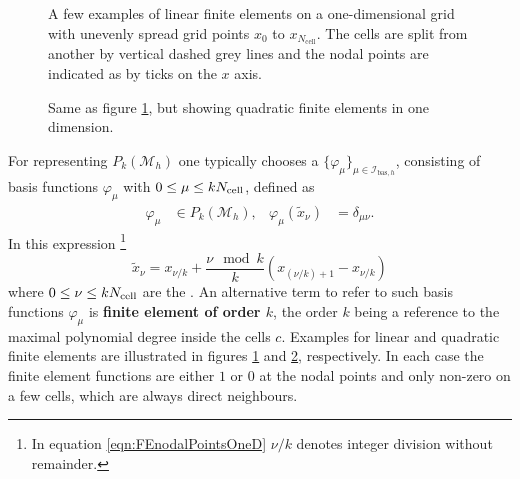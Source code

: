 \begin{figure}
	\centering
	\caption[Examples of linear finite elements in one dimension]
	{
		A few examples of linear finite elements
		on a one-dimensional grid
		with unevenly spread grid points
		$x_0$ to $x_{N_\text{cell}}$.
		The cells are split from another
		by vertical dashed grey lines
		and the nodal points are indicated as by ticks
		on the $x$ axis.
	}
	\label{fig:FEoneDimLin}
\end{figure}
\begin{figure}
	\centering
	\caption[Examples of quadratic finite elements in one dimension]
	{
		Same as figure \ref{fig:FEoneDimLin},
		but showing quadratic finite elements in one dimension.
	}
	\label{fig:FEoneDimQuad}
\end{figure}
\newcommand{\Ibash}{\mathcal{I}_{\text{bas},h}}
For representing $P_k(\mathcal{M}_h)$
one typically chooses a  $\{\varphi_\mu\}_{\mu\in \Ibash}$,
consisting of basis functions $\varphi_\mu$ with $0 \leq \mu \leq k N_\text{cell}$,
defined as
\begin{align*}
	\varphi_\mu &\in P_k(\mathcal{M}_h), &
	\varphi_\mu(\tilde{x}_\nu) &= \delta_{\mu\nu}.
\end{align*}
In this expression%
\footnote{In equation \eqref{eqn:FEnodalPointsOneD} $\nu/k$ denotes integer division
without remainder.}
\begin{equation}
	\tilde{x}_\nu = x_{\nu/k} + \frac{\nu \!\! \mod k}{k} \left( x_{(\nu/k) +1} - x_{\nu/k} \right)
	\label{eqn:FEnodalPointsOneD}
\end{equation}
where $0 \leq \nu \leq k N_\text{cell}$ are the .
An alternative term to refer to such
basis functions $\varphi_\mu$
is \textbf{finite element of order $k$},
the order $k$ being a reference to the maximal polynomial degree inside the cells $c$.
Examples for linear and quadratic finite elements are
illustrated in figures \ref{fig:FEoneDimLin} and \ref{fig:FEoneDimQuad}, respectively.
In each case the finite element functions
are either $1$ or $0$ at the nodal points and only
non-zero on a few cells, which are always direct neighbours.

